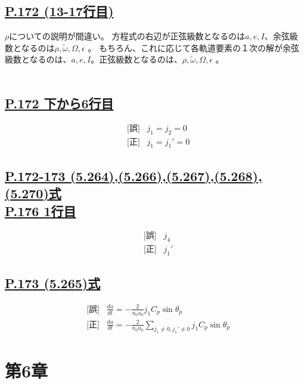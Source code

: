 \documentclass[9pt,fleqn]{bxjsarticle}
\begin{document}
\subsection*{\underline{P.172 (13-17行目)}}
$\rho$についての説明が間違い。
方程式の右辺が正弦級数となるのは$a,e,I$、余弦級数となるのは$\rho,\tilde{\omega},\Omega,\epsilon$ 。
もちろん、これに応じて各軌道要素の１次の解が余弦級数となるのは、$a,e,I$。正弦級数となるのは、$\rho,\tilde{\omega},\Omega,\epsilon$ 。\\\\

\subsection*{\underline{P.172 下から6行目}}
\begin{align*}
    &\text{[誤]} \hspace{10pt} j_1 = j_2 = 0 \\
    &\text{[正]} \hspace{10pt} j_1 = {j_1}' = 0 
\end{align*}

\subsection*{\underline{P.172-173 (5.264),(5.266),(5.267),(5.268),(5.270)式}\\ \underline{P.176 1行目}}
\begin{align*}
    &\text{[誤]} \hspace{10pt} j_4\\
    &\text{[正]} \hspace{10pt} {j_1}'
\end{align*}

\subsection*{\underline{P.173 (5.265)式}}
\begin{align*}
    &\text{[誤]} \hspace{10pt} \frac{da}{dt} = -\frac{2}{n_0a_0}j_1C_p\sin{\theta_p}\\
    &\text{[正]} \hspace{10pt} \frac{da}{dt} = -\frac{2}{n_0a_0}\sum_{j_1\neq0,{j_1}'\neq0}j_1C_p\sin{\theta_p} 
\end{align*}


\section*{第6章}
\end{document}

